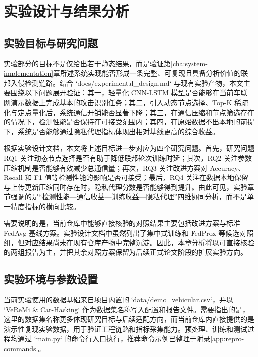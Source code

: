\chapter{实验设计与结果分析}
\label{cha:experiment-analysis}

\section{实验目标与研究问题}
\label{sec:experiment-objectives}

实验部分的目标不是仅给出若干静态结果，而是验证第\ref{cha:system-implementation}章所述系统实现能否形成一条完整、可复现且具备分析价值的联邦入侵检测链路。结合 `docs/experimental\_design.md` 与现有实验产物，本文主要围绕以下问题展开验证：其一，轻量化 CNN-LSTM 模型是否能够在当前车联网演示数据上完成基本的攻击识别任务；其二，引入动态节点选择、Top-K 稀疏化与定点量化后，系统通信开销能否显著下降；其三，在通信压缩和节点筛选存在的情况下，检测性能是否保持在可接受范围内；其四，在原始数据不出本地的前提下，系统是否能够通过隐私代理指标体现出相对基线更高的综合收益。

根据实验设计文档，本文将上述目标进一步对应为四个研究问题。首先，研究问题 RQ1 关注动态节点选择是否有助于降低联邦轮次训练时延；其次，RQ2 关注参数压缩机制是否能够有效减少总通信量；再次，RQ3 关注改进方案对 Accuracy、Recall 和 F1 值等检测性能的影响是否可接受；最后，RQ4 关注在数据本地保留与上传更新压缩同时存在时，隐私代理分数是否能够得到提升。由此可见，实验章节强调的是“检测性能—通信收益—训练收益—隐私代理”四维协同分析，而不是单一精度指标的横向比较。

需要说明的是，当前仓库中能够直接核验的对照结果主要包括改进方案与标准 FedAvg 基线方案。实验设计文档中虽然列出了集中式训练和 FedProx 等候选对照组，但对应结果尚未在现有仓库产物中完整沉淀。因此，本章分析将以可直接核验的两组报告为主，并把其余对照方案保留为后续正式论文阶段的扩展实验方向。

\section{实验环境与参数设置}
\label{sec:experiment-setup}

当前实验使用的数据基础来自项目内置的 `data/demo\_vehicular.csv`，并以 `VeReMi \& Car-Hacking` 作为数据集名称写入配置和报告文件。需要指出的是，这里的数据集名称更多体现研究目标与后续适配方向，而当前仓库内直接提供的是演示性复现实验数据，用于验证工程链路和指标采集能力。预处理、训练和测试过程均通过 `main.py` 的命令行入口执行，推荐命令示例已整理于附录\ref{app:repro-commands}。

